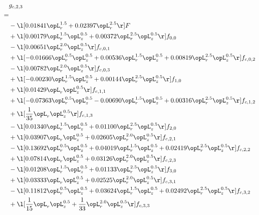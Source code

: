 \begin{alignat}{2} 
\label{eq:g_23_0} 
& g_{c,2,3} \nonumber \\ 
 = \\ 
& - \l[  0.01841 \opL_r^{1.5} +  0.02397 \opL_r^{2.5}  \r] F \nonumber \\ 
& + \l[  0.00179 \opL_r^{1.5} \opL_z^{0.5} +  0.00372 \opL_r^{2.5} \opL_z^{0.5}  \r] f_{0,0} \nonumber \\ 
& - \l[  0.00651 \opL_r^{2.0} \opL_z^{0.5}  \r] f_{c,0,1} \nonumber \\ 
& + \l[  -0.01666 \opL_r^{0.5} \opL_z^{0.5} +  0.00536 \opL_r^{1.5} \opL_z^{0.5} +  0.00819 \opL_r^{2.5} \opL_z^{0.5}  \r] f_{c,0,2} \nonumber \\ 
& - \l[  0.00782 \opL_r^{2.0} \opL_z^{0.5}  \r] f_{c,0,3} \nonumber \\ 
& + \l[  -0.00230 \opL_r^{1.5} \opL_z^{0.5} +  0.00144 \opL_r^{2.5} \opL_z^{0.5}  \r] f_{1,0} \nonumber \\ 
& + \l[  0.01429 \opL_r \opL_z^{0.5}  \r] f_{c,1,1} \nonumber \\ 
& + \l[  -0.07363 \opL_r^{0.5} \opL_z^{0.5}   -0.00690 \opL_r^{1.5} \opL_z^{0.5} +  0.00316 \opL_r^{2.5} \opL_z^{0.5}  \r] f_{c,1,2} \nonumber \\ 
& + \l[ \frac{1}{35} \opL_r \opL_z^{0.5}  \r] f_{c,1,3} \nonumber \\ 
& - \l[  0.01340 \opL_r^{1.5} \opL_z^{0.5} +  0.01100 \opL_r^{2.5} \opL_z^{0.5}  \r] f_{2,0} \nonumber \\ 
& + \l[  0.03907 \opL_r \opL_z^{0.5} +  0.02605 \opL_r^{2.0} \opL_z^{0.5}  \r] f_{c,2,1} \nonumber \\ 
& - \l[  0.13692 \opL_r^{0.5} \opL_z^{0.5} +  0.04019 \opL_r^{1.5} \opL_z^{0.5} +  0.02419 \opL_r^{2.5} \opL_z^{0.5}  \r] f_{c,2,2} \nonumber \\ 
& + \l[  0.07814 \opL_r \opL_z^{0.5} +  0.03126 \opL_r^{2.0} \opL_z^{0.5}  \r] f_{c,2,3} \nonumber \\ 
& - \l[  0.01208 \opL_r^{1.5} \opL_z^{0.5} +  0.01133 \opL_r^{2.5} \opL_z^{0.5}  \r] f_{3,0} \nonumber \\ 
& + \l[  0.03333 \opL_r \opL_z^{0.5} +  0.02525 \opL_r^{2.0} \opL_z^{0.5}  \r] f_{c,3,1} \nonumber \\ 
& - \l[  0.11812 \opL_r^{0.5} \opL_z^{0.5} +  0.03624 \opL_r^{1.5} \opL_z^{0.5} +  0.02492 \opL_r^{2.5} \opL_z^{0.5}  \r] f_{c,3,2} \nonumber \\ 
& + \l[ \frac{1}{15} \opL_r \opL_z^{0.5} + \frac{1}{33} \opL_r^{2.0} \opL_z^{0.5}  \r] f_{c,3,3} \nonumber \\ 
\end{alignat} 


